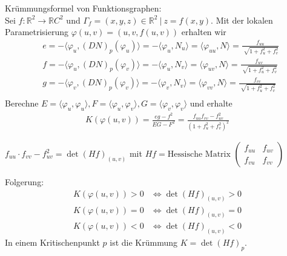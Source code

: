 \documentclass[../main.tex]{subfiles}
\begin{document}
\begin{application}
    Krümmungsformel von Funktionsgraphen:\\
    Sei $f:\mathbb{R}^{2}\rightarrow\mathbb{R} C^{2}$ und $\Gamma_{f}={(x,y,z)\in\mathbb{R}^{2} \ \vert \ z=f(x,y)}$. Mit der lokalen Parametrisierung $\varphi(u,v) = (u,v,f(u,v))$ erhalten wir \begin{align*}
        &e=-\langle\varphi_{u},(DN)_{p}(\varphi_{u})\rangle = -\langle\varphi_{u},N_{u}\rangle = \langle\varphi_{uu},N\rangle = \frac{f_{uu}}{\sqrt[]{1+f_{u}^{2}+f_{v}^{2}}}\\
        &f=-\langle\varphi_{u},(DN)_{p}(\varphi_{v})\rangle = -\langle\varphi_{u},N_{v}\rangle = \langle\varphi_{uv},N\rangle = \frac{f_{uv}}{\sqrt[]{1+f_{u}^{2}+f_{v}^{2}}}\\
        &g=-\langle\varphi_{v},(DN)_{p}(\varphi_{v})\rangle = -\langle\varphi_{v},N_{v}\rangle = \langle\varphi_{vv},N\rangle = \frac{f_{vv}}{\sqrt[]{1+f_{u}^{2}+f_{v}^{2}}}\\       
    \end{align*}
    Berechne $E=\langle\varphi_{u},\varphi_{u}\rangle,F=\langle\varphi_{u},\varphi_{v}\rangle,G=\langle\varphi_{v},\varphi_{v}\rangle$ und erhalte \begin{align*}
        K(\varphi(u,v)) = \frac{eg-f^{2}}{EG-F^{2}} = \frac{f_{uu}f_{vv}-f_{uv}^{2}}{(1+f_{u}^{2}+f_{v}^{2})^{2}}
    \end{align*}
\end{application}
\begin{remark}
    $f_{uu}\cdot f_{vv} - f_{uv}^{2} = \det(Hf)_{(u,v)}$ mit $Hf = \text{Hessische Matrix }\begin{pmatrix}
        f_{uu} & f_{uv} \\ f_{vu} & f_{vv}
    \end{pmatrix}$
\end{remark}
Folgerung: \begin{align*}
    K(\varphi(u,v)) > 0 &\iff \det(Hf)_{(u,v)}>0\\
    K(\varphi(u,v)) = 0 &\iff \det(Hf)_{(u,v)}=0\\
    K(\varphi(u,v)) < 0 &\iff \det(Hf)_{(u,v)}<0
\end{align*}
In einem Kritischenpunkt $p$ ist die Krümmung $K = \det(Hf)_{p}$.
\end{document}
